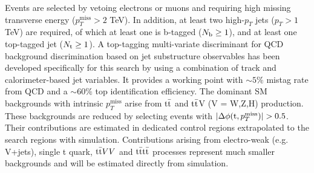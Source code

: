 \documentclass[11pt,twoside,a4paper]{cernrep}
\begin{document}
Events are selected by vetoing electrons or muons and requiring high missing transverse energy ($p_T^{\mathrm{miss}}>2$ TeV). In addition, at least two high-$p_T$ jets ($p_T > 1$ TeV) are required, of which at least one is b-tagged ($N_{\rm b} \geq 1$), and at least one top-tagged jet ($N_{\rm t} \geq 1$). A top-tagging multi-variate discriminant for QCD background discrimination based on jet substructure observables has been developed specifically for this search by using a combination of track and calorimeter-based jet variables. It provides a working point with $\sim5\%$ mistag rate from QCD and a $\sim60\%$ top identification efficiency. The dominant SM backgrounds with intrinsic $p_T^{\mathrm{miss}}$ arise from $\rm t \bar{t}$ and $\rm t \bar{t}$V (V {=} W,Z,H) production. These backgrounds are reduced by selecting events with $|\Delta \phi({\rm t},p_T^{\mathrm{miss}})| > 0.5$.  Their contributions are estimated in dedicated control regions extrapolated to the search regions with simulation. Contributions arising from electro-weak (e.g. V+jets), single t quark, ${\rm t \bar{t}} VV$ and $\rm t \bar{t} t \bar{t}$ processes represent much smaller backgrounds and will be estimated directly from simulation.
\end{document}
